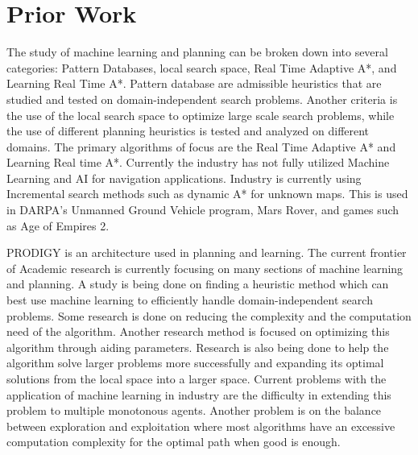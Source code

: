 \documentclass[tog]{acmsiggraph}
\begin{document}
\section{Prior Work}
The study of machine learning and planning can be broken down into
several categories: Pattern Databases, local search space, Real Time
Adaptive A*, and Learning Real Time A*. Pattern database are
admissible heuristics that are studied and tested on
domain-independent search problems. Another criteria is the use of the
local search space to optimize large scale search problems, while the
use of different planning heuristics is tested and analyzed on
different domains.\cite{haslum2007domain} The primary algorithms of
focus are the Real Time Adaptive A* and Learning Real time A*.
Currently the industry has not fully utilized Machine Learning and AI
for navigation applications. Industry is currently using Incremental
search methods such as dynamic A* for unknown maps. This is used in
DARPA’s Unmanned Ground Vehicle program, Mars Rover, and games such as
Age of Empires 2.

PRODIGY is an architecture used in planning and
learning.\cite{stone1994need} The current frontier of Academic
research is currently focusing on many sections of machine learning
and planning. A study is being done on finding a heuristic method
which can best use machine learning to efficiently handle
domain-independent search problems. Some research is done on reducing
the complexity and the computation need of the algorithm. Another
research method is focused on optimizing this algorithm through aiding
parameters. Research is also being done to help the algorithm solve
larger problems more successfully and expanding its optimal solutions
from the local space into a larger space. Current problems with the
application of machine learning in industry are the difficulty in
extending this problem to multiple monotonous agents. Another problem
is on the balance between exploration and exploitation where most
algorithms have an excessive computation complexity for the optimal
path when good is enough.
\end{document}
